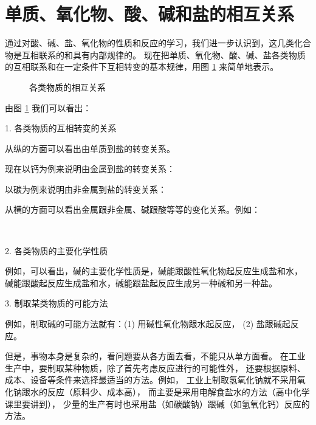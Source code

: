 \newpage %
\section{单质、氧化物、酸、碱和盐的相互关系}\label{sec:5-9}

通过对酸、碱、盐、氧化物的性质和反应的学习，我们进一步认识到，这几类化合物是互相联系的和具有内部规律的。
现在把单质、氧化物、酸、碱、盐各类物质的互相联系和在一定条件下互相转变的基本规律，用图 \ref{fig:5-5} 来简单地表示。

\begin{figure}[htbp]
    \centering
    
    \caption{各类物质的相互关系}\label{fig:5-5}
\end{figure}

由图 \ref{fig:5-5} 我们可以看出：

1. 各类物质的互相转变的关系

从纵的方面可以看出由单质到盐的转变关系。

现在以钙为例来说明由金属到盐的转变关系：
\begin{fangchengshi}
\end{fangchengshi}

以碳为例来说明由非金属到盐的转变关系：
\begin{fangchengshi}
\end{fangchengshi}

从横的方面可以看出金属跟非金属、碱跟酸等等的变化关系。例如：
\begin{fangchengshi}
     \\[-.8em]
\end{fangchengshi}

2. 各类物质的主要化学性质

例如，可以看出，碱的主要化学性质是，碱能跟酸性氧化物起反应生成盐和水，
碱能跟酸起反应生成盐和水，碱能跟盐起反应生成另一种碱和另一种盐。

3. 制取某类物质的可能方法

例如，制取碱的可能方法就有：(1) 用碱性氧化物跟水起反应， (2) 盐跟碱起反应。

但是，事物本身是复杂的，看问题要从各方面去看，不能只从单方面看。
在工业生产中，要制取某种物质，除了首先考虑反应进行的可能性外，
还要根据原料、成本、设备等条件来选择最适当的方法。例如，
工业上制取氢氧化钠就不采用氧化钠跟水的反应（原料少、成本高），
而主要是采用电解食盐水的方法（高中化学课里要讲到），
少量的生产有时也采用盐（如碳酸钠）跟碱（如氢氧化钙）反应的方法。

